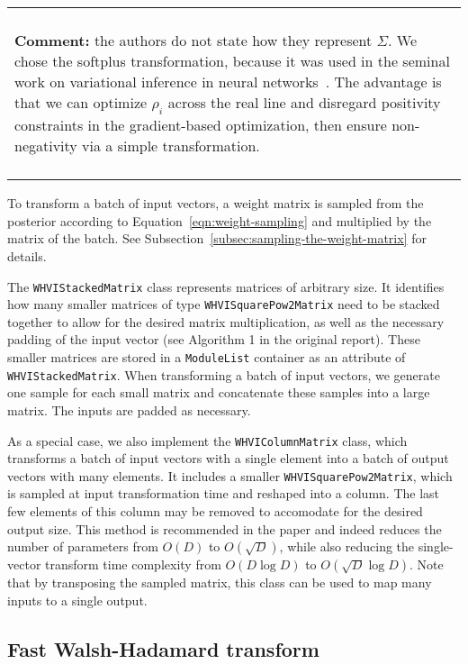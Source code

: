 \documentclass[11pt]{article}
\newenvironment{comment}
    {
    \begin{center}
    \begin{tabular}{|p{0.9\hsize}|}
    \hline\\
    \begin{footnotesize}\textbf{Comment:}}
    {
    \end{footnotesize}
    \\\\\hline
    \end{tabular}
    \end{center}
    }
\begin{document}
    \begin{comment}
    the authors do not state how they represent $\Sigma$.
    We chose the softplus transformation, because it was used in the seminal work on variational inference in neural networks~\cite{blundell2015weight}.
    The advantage is that we can optimize $\rho_i$ across the real line and disregard positivity constraints in the gradient-based optimization, then ensure non-negativity via a simple transformation.
    \end{comment}

    To transform a batch of input vectors, a weight matrix is sampled from the posterior according to Equation~\ref{eqn:weight-sampling} and multiplied by the matrix of the batch. See Subsection~\ref{subsec:sampling-the-weight-matrix} for details.

    The \texttt{WHVIStackedMatrix} class represents matrices of arbitrary size.
    It identifies how many smaller matrices of type \texttt{WHVISquarePow2Matrix} need to be stacked together to allow for the desired matrix multiplication, as well as the necessary padding of the input vector (see Algorithm 1 in the original report).
    These smaller matrices are stored in a \texttt{ModuleList} container as an attribute of \texttt{WHVIStackedMatrix}. When transforming a batch of input vectors, we generate one sample for each small matrix and concatenate these samples into a large matrix. The inputs are padded as necessary.

    As a special case, we also implement the \texttt{WHVIColumnMatrix} class, which transforms a batch of input vectors with a single element into a batch of output vectors with many elements.
    It includes a smaller \texttt{WHVISquarePow2Matrix}, which is sampled at input transformation time and reshaped into a column.
    The last few elements of this column may be removed to accomodate for the desired output size.
    This method is recommended in the paper and indeed reduces the number of parameters from $O(D)$ to $O(\sqrt{D})$, while also reducing the single-vector transform time complexity from $O(D\log D)$ to $O(\sqrt{D}\log D)$.
    Note that by transposing the sampled matrix, this class can be used to map many inputs to a single output.

    \subsection{Fast Walsh-Hadamard transform}
\end{document}
